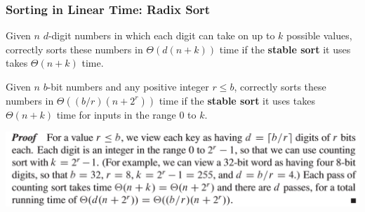 \documentclass[UTF8,11pt,handout]{beamer}
\begin{document}
\begin{frame}
\frametitle{Sorting in Linear Time: Radix Sort}
\begin{center}
	\begin{lemma}[8.3]
		Given $n$ $d$-digit numbers in which each digit can take on up to $k$ possible values,  correctly sorts these numbers in \textbf{\color{blue}$\Theta(d(n+k))$} time if the \textbf{\color{green!90!black!90!}stable sort} it uses takes \textbf{\color{green!90!black!90!}$\Theta(n+k)$} time. 
	\end{lemma}

	\begin{lemma}[8.4]
		Given $n$ $b$-bit numbers and any positive integer {\color{red}$r$}$\le b$,   correctly sorts these numbers in $\Theta((b/r)(n+2^r))$ time if the \textbf{\color{green!90!black!90!}stable sort} it uses takes \textbf{\color{green!90!black!90!}$\Theta(n+k)$} time for inputs in the range $0$ to $k$. 
	\end{lemma}
	\includegraphics[width=0.9\linewidth]{figs/proof_lemma_8-4.png}
\end{center}
\end{frame}
\end{document}
